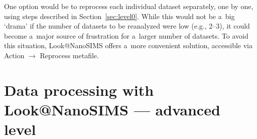 \documentclass[a4paper, 11pt]{article}
\newcommand{\lans}[1]{{\color{magenta}#1}}
\newcommand\ra{\rightarrow}
\newcommand\addon[1]{-- {\small #1}}
\newcounter{step}
\begin{document}
One option would be to reprocess each individual dataset separately, one by one, using steps described in Section~\ref{sec:level0}. While this would not be a~big `drama' if the number of  datasets to be reanalyzed were low (e.g., 2--3), it could become a~major source of frustration for a~larger number of datasets. To avoid this situation, Look@NanoSIMS offers a~more convenient solution, accessible via \lans{Action} $\ra$ \lans{Reprocess metafile}.




\section{Data processing with Look@NanoSIMS --- advanced level}
\label{sec:level3}


\end{document}
